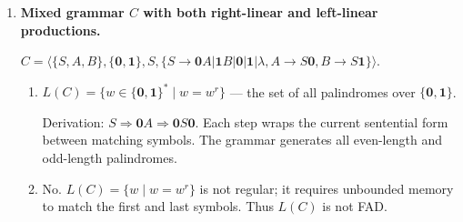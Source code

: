 \begin{enumerate}[{8.}1. ]
\begin{enumerate}
\item $L(G_1) = \{\pmb{a}^n\pmb{baa} \mid n \in \NN\}$ (Example 8.7):

\textbf{Claim}: For all $n \geq 0$, $S \DRightarrow \pmb{a}^n\pmb{baa}$ in $G_1$.
\textbf{Base} ($n=0$): $S \Rightarrow \pmb{baa}$ (production $S \to \pmb{baa}$).
\textbf{Step}: If $S \DRightarrow \pmb{a}^n\pmb{baa}$, then $S \Rightarrow \pmb{a}S \DRightarrow \pmb{a}\cdot\pmb{a}^n\pmb{baa} = \pmb{a}^{n+1}\pmb{baa}$.
Conversely, any derivation from $S$ either uses $S \to \pmb{baa}$ (giving $\lambda\cdot\pmb{baa}$) or $S \to \pmb{a}S$ (giving a longer string by IH). So $L(G_1) = \{\pmb{a}^n\pmb{baa}\}$. \qed

\item $L(G_8) = \{\pmb{a}^n\pmb{baa} \mid n \in \NN\}$ (Example 8.9):
\textbf{Claim}: For every $n \geq 0$, $Z \DRightarrow \pmb{a}^n\pmb{baa}$ in
$G_8$.

\textbf{Base} ($n=0$): $Z \Rightarrow \pmb{baa}$.

\textbf{Step}: If $Z \DRightarrow \pmb{a}^n\pmb{baa}$, then
$Z \Rightarrow \pmb{a}Z \DRightarrow \pmb{a}^{n+1}\pmb{baa}$.

Conversely, any derivation from $Z$ either uses $Z\to\pmb{baa}$ immediately or
begins with $Z\to\pmb{a}Z$. Repeating the second choice $n$ times and then
using $Z\to\pmb{baa}$ yields exactly the string $\pmb{a}^n\pmb{baa}$, and there
is no other way to terminate a derivation. Therefore
$L(G_8)=\{\pmb{a}^n\pmb{baa}\mid n\in\NN\}$. \qed
\end{enumerate}

\item \textbf{Mixed grammar $C$ with both right-linear and left-linear productions.}

$C = \langle\{S,A,B\},\{\pmb{0},\pmb{1}\},S,\{S\to\pmb{0}A|\pmb{1}B|\pmb{0}|\pmb{1}|\lambda,A\to S\pmb{0},B\to S\pmb{1}\}\rangle$.

\begin{enumerate}
\item $L(C) = \{w \in \{\pmb{0},\pmb{1}\}^* \mid w = w^r\}$ --- the set of all palindromes over $\{\pmb{0},\pmb{1}\}$.

Derivation: $S \Rightarrow \pmb{0}A \Rightarrow \pmb{0}S\pmb{0}$. Each step wraps the current sentential form between matching symbols. The grammar generates all even-length and odd-length palindromes.

\item No. $L(C) = \{w \mid w = w^r\}$ is not regular; it requires unbounded
memory to match the first and last symbols. Thus $L(C)$ is not FAD.


\end{enumerate}
\end{enumerate}
